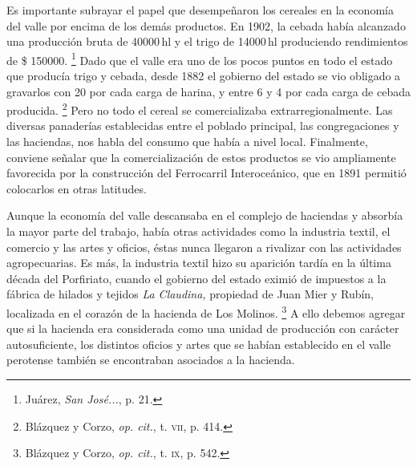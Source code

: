 \documentclass[14pt,twoside,final]{extbook} %
\let\oldfootnote\footnote
\renewcommand\footnote[1]{%
\oldfootnote{\hspace{1mm}#1}}
\begin{document}
Es importante subrayar el papel que desempeñaron los cereales en la economía del valle por encima de los demás productos. En 1902, la cebada había alcanzado una producción bruta de 40000\,hl y el trigo de 14000\,hl produciendo rendimientos de \$ 150000.\footnote{Juárez, \emph{San José...}, p. 21.} Dado que el valle era uno de los pocos puntos en todo el estado que producía trigo y cebada, desde 1882 el gobierno del estado se vio obligado a gravarlos con \textcent{} 20 por cada carga de harina, y entre \textcent{} 6 y \textcent{} 4 por cada carga de cebada producida.\footnote{Blázquez y Corzo, \emph{op. cit.}, t. \textsc{vii}, p. 414.} Pero no todo el cereal se comercializaba extrarregionalmente. Las diversas panaderías establecidas entre el poblado principal, las congregaciones y las haciendas, nos habla del consumo que había a nivel local. Finalmente, conviene señalar que la comercialización de estos productos se vio ampliamente favorecida por la construcción del Ferrocarril Interoceánico, que en 1891 permitió colocarlos en otras latitudes.

Aunque la economía del valle descansaba en el complejo de haciendas y absorbía la mayor parte del trabajo, había otras actividades como la industria textil, el comercio y las artes y oficios, éstas nunca llegaron a rivalizar con las actividades agropecuarias. Es más, la industria textil hizo su aparición tardía en la última década del Porfiriato, cuando el gobierno del estado eximió de impuestos a la fábrica de hilados y tejidos \emph{La Claudina,} propiedad de Juan Mier y Rubín, localizada en el corazón de la hacienda de Los Molinos.\footnote{Blázquez y Corzo, \emph{op. cit.}, t. \textsc{ix}, p. 542.} A ello debemos agregar que si la hacienda era considerada como una unidad de producción con carácter autosuficiente, los distintos oficios y artes que se habían establecido en el valle perotense también se encontraban asociados a la hacienda.
\end{document}
